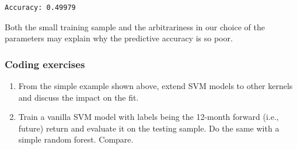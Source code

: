 \begin{verbatim}
Accuracy: 0.49979
\end{verbatim}

Both the small training sample and the arbitrariness in our choice of the parameters may explain why the predictive accuracy is so poor.

\subsubsection{Coding exercises}

\begin{enumerate}
\item From the simple example shown above, extend SVM models to other kernels and discuss the impact on the fit.
\item Train a vanilla SVM model with labels being the 12-month forward (i.e., future) return and evaluate it on the testing sample. Do the same with a simple random forest. Compare.
\end{enumerate}